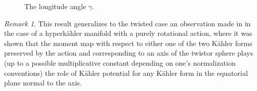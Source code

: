 \documentclass[11pt]{amsart}
\theoremstyle{remark}
\newtheorem*{remark}{Remark}
\theoremstyle{remark}
\theoremstyle{definition}
\theoremstyle{definition}
\theoremstyle{definition}
\newcommand{\0}{{\scriptstyle 0'}} %
\newcommand{\1}{{\scriptstyle 1'}}
\begin{document}
\begin{figure}[ht]
\vskip-12pt
\caption{The longitude angle $\gamma$.}
\vskip-10pt
\end{figure} 

\begin{remark}
This result generalizes to the twisted case an observation made in \cite{MR877637} in the case of a hyperk\"ahler manifold with a purely rotational action, where it was shown that the moment map with respect to either one of the two K\"ahler forms preserved by the action and corresponding to an axis of the twistor sphere plays (up to a possible multiplicative constant depending on one's normalization conventions) the role of K\"ahler potential for any K\"ahler form in the equatorial plane normal to the axis.
\end{remark}


\subsubsection{} \label{ssec:sofp}
\end{document}
